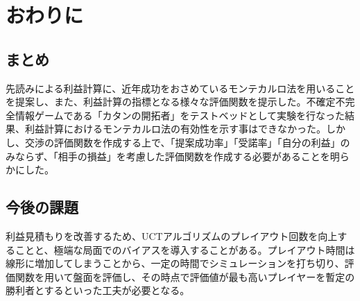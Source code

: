 \documentclass[a4, 10pt,dvipdfmx,twocolumn]{jsarticle}
\begin{document}
\section{おわりに}


\subsection{まとめ}

先読みによる利益計算に、近年成功をおさめているモンテカルロ法を用いることを提案し、また、利益計算の指標となる様々な評価関数を提示した。不確定不完全情報ゲームである「カタンの開拓者」をテストベッドとして実験を行なった結果、利益計算におけるモンテカルロ法の有効性を示す事はできなかった。しかし、交渉の評価関数を作成する上で、「提案成功率」「受諾率」「自分の利益」のみならず、「相手の損益」を考慮した評価関数を作成する必要があることを明らかにした。

\subsection{今後の課題}
利益見積もりを改善するため、UCTアルゴリズムのプレイアウト回数を向上することと、極端な局面でのバイアスを導入することがある。プレイアウト時間は線形に増加してしまうことから、一定の時間でシミュレーションを打ち切り、評価関数を用いて盤面を評価し、その時点で評価値が最も高いプレイヤーを暫定の勝利者とするといった工夫が必要となる。





 
\end{document}
